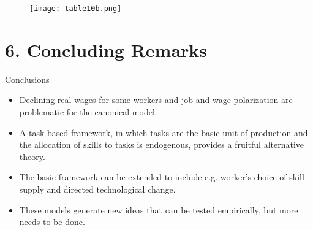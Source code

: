 \documentclass[notes=show]{beamer}
\begin{document}
\newpage
\begin{center}
\begin{figure}
\texttt{[image: table10b.png]}
\end{figure} 
\end{center}
\newpage

\section{6. Concluding Remarks}

\begin{frame}{Conclusions}
\begin{itemize}
\item Declining real wages for some workers and job and wage polarization are problematic for the canonical model. \smallskip  
\item A task-based framework, in which tasks are the basic unit of production and the allocation of skills to tasks is endogenous, provides a fruitful alternative theory. \smallskip 
\item The basic framework can be extended to include e.g. worker's choice of skill supply and directed technological change. \smallskip 
\item These models generate new ideas that can be tested empirically, but more needs to be done.
\end{itemize}
\end{frame}
\end{document}
